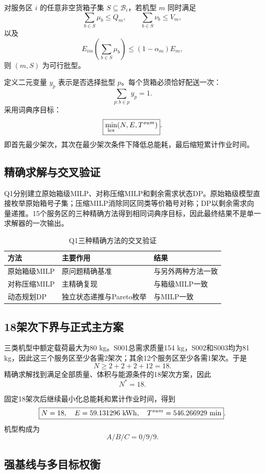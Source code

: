 \documentclass[UTF8,a4paper,12pt]{ctexart}
\begin{document}
对服务区 $i$ 的任意非空货箱子集 $S\subseteq\mathcal B_i$，若机型 $m$ 同时满足
\[
\sum_{b\in S}\mu_b\le Q_m,
\qquad
\sum_{b\in S}\nu_b\le V_m,
\]
以及
\[
E_{im}\left(\sum_{b\in S}\mu_b\right)
\le(1-\alpha_m)E_m,
\]
则 $(m,S)$ 为可行批型。

定义二元变量 $y_p$ 表示是否选择批型 $p$。每个货箱必须恰好配送一次：
\[
\sum_{p:b\in p}y_p=1.
\]
采用词典序目标：
\[
\boxed{
\min_{\rm lex}(N,E,T^{sum})
}.
\]
即首先最少架次，其次在最少架次条件下降低总能耗，最后缩短累计作业时间。

\subsection{精确求解与交叉验证}

Q1分别建立原始箱级MILP、对称压缩MILP和剩余需求状态DP。原始箱级模型直接枚举原始箱号子集；压缩MILP消除同区同类等价箱号对称；DP以剩余需求向量递推。15个服务区的三种精确方法得到相同词典序目标，因此最终结果不是单一求解器的一次输出。

\begin{table}[H]
\centering
\caption{Q1三种精确方法的交叉验证}
\begin{tabular}{lll}
\toprule
方法 & 主要作用 & 结果\\
\midrule
原始箱级MILP & 原问题精确基准 & 与另外两种方法一致\\
对称压缩MILP & 主精确复现 & 与箱级MILP一致\\
动态规划DP & 独立状态递推与Pareto枚举 & 与MILP一致\\
\bottomrule
\end{tabular}
\end{table}

\subsection{18架次下界与正式主方案}

三类机型中额定载荷最大为80 kg。S001总需求质量154 kg，S002和S003均为81 kg，因此这三个服务区至少各需2架次；其余12个服务区至少各需1架次。于是
\[
N\ge2+2+2+12=18.
\]
精确求解找到满足全部质量、体积与能源条件的18架次方案，因此
\[
\boxed{N^*=18}.
\]

固定18架次后继续最小化总能耗和累计作业时间，得到
\[
\boxed{
N=18,\quad
E=59.131296\ {\rm kWh},\quad
T^{sum}=546.266929\ {\rm min}
}.
\]
机型构成为
\[
A/B/C=0/9/9.
\]

\subsection{强基线与多目标权衡}
\end{document}
